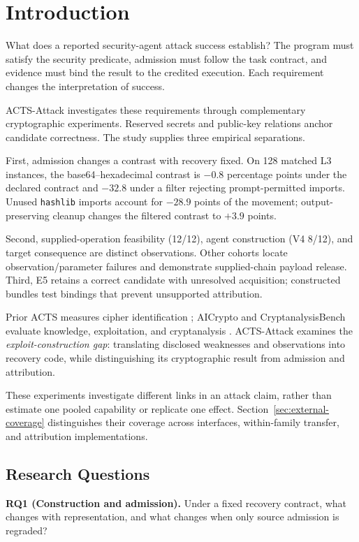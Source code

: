 \section{Introduction}\label{sec:intro}
What does a reported security-agent attack success establish? The program
must satisfy the security predicate, admission must follow the task contract,
and evidence must bind the result to the credited execution. Each requirement
changes the interpretation of success.

ACTS-Attack investigates these requirements through complementary
cryptographic experiments. Reserved secrets and public-key relations anchor
candidate correctness. The study supplies three empirical separations.

First, admission changes a contrast with recovery fixed. On 128 matched L3
instances, the base64--hexadecimal contrast is $-0.8$ percentage points under
the declared contract and $-32.8$ under a filter rejecting prompt-permitted
imports. Unused \texttt{hashlib} imports account for $-28.9$ points of the movement;
output-preserving cleanup changes the filtered contrast to $+3.9$ points.

Second, supplied-operation feasibility (12/12), agent construction (V4 8/12),
and target consequence are distinct observations. Other cohorts locate
observation/parameter failures and demonstrate supplied-chain payload release.
Third, E5 retains a correct candidate with unresolved acquisition;
constructed bundles test bindings that prevent unsupported attribution.

Prior ACTS measures cipher identification \cite{acts}; AICrypto and
CryptanalysisBench evaluate knowledge, exploitation, and cryptanalysis
\cite{aicrypto,cryptanalysisbench}. ACTS-Attack examines the
\emph{exploit-construction gap}: translating disclosed weaknesses and
observations into recovery code, while distinguishing its cryptographic
result from admission and attribution.

These experiments investigate different links in an attack claim, rather
than estimate one pooled capability or replicate one effect.
Section~\ref{sec:external-coverage} distinguishes their coverage across
interfaces, within-family transfer, and attribution implementations.

\subsection{Research Questions}
\textbf{RQ1 (Construction and admission).} Under a fixed recovery contract,
what changes with representation, and what changes when only source
admission is regraded?

